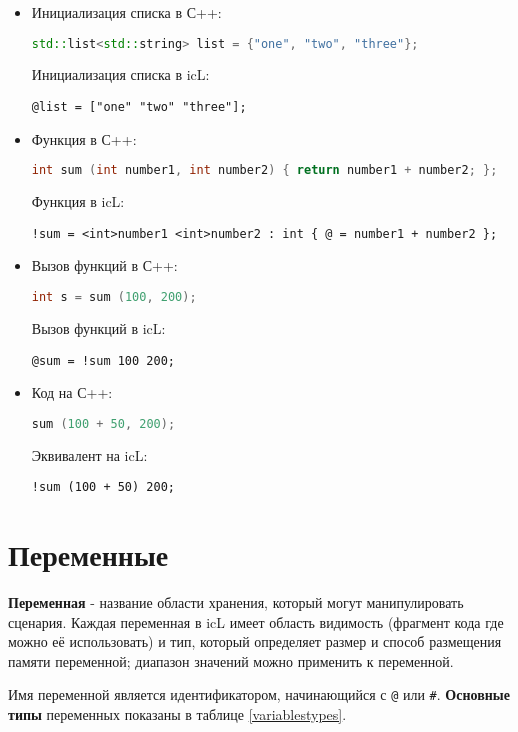 \documentclass[a4paper, 14pt]{extarticle}
\newenvironment{icItems}
	{ \begin{itemize} [noitemsep,nolistsep] }
	{ \end{itemize} }
\begin{document}
\begin{icItems}
	\item Инициализация списка в С++:
\begin{lstlisting}[numbers=none, language=C++]
std::list<std::string> list = {"one", "two", "three"};
\end{lstlisting}
	Инициализация списка в icL:
\begin{lstlisting}[numbers=none]
@list = ["one" "two" "three"];
\end{lstlisting}
	\item Функция в С++:
\begin{lstlisting}[numbers=none, language=C++]
int sum (int number1, int number2) { return number1 + number2; };
\end{lstlisting}
	Функция в icL:
\begin{lstlisting}[numbers=none]
!sum = <int>number1 <int>number2 : int { @ = number1 + number2 };
\end{lstlisting}
	\item Вызов функций в С++:
\begin{lstlisting}[numbers=none, language=C++]
int s = sum (100, 200);
\end{lstlisting}
	Вызов функций в icL:
\begin{lstlisting}[numbers=none]
@sum = !sum 100 200;
\end{lstlisting}
	\item Код на С++:
\begin{lstlisting}[numbers=none, language=C++]
sum (100 + 50, 200);
\end{lstlisting}
	Эквивалент на icL:
\begin{lstlisting}[numbers=none]
!sum (100 + 50) 200;
\end{lstlisting}
\end{icItems}

\section{Переменные}

\textbf{Переменная} - название области хранения, который могут манипулировать сценария. Каждая переменная в icL имеет область видимость (фрагмент кода где можно её использовать) и тип, который определяет размер и способ размещения памяти переменной; диапазон значений можно применить к переменной.

Имя переменной является идентификатором, начинающийся с \lstinline`@` или {\color{blue2}\lstinline`#`}.
\textbf{Основные типы} переменных показаны в таблице \ref{variablestypes}.
\end{document}
